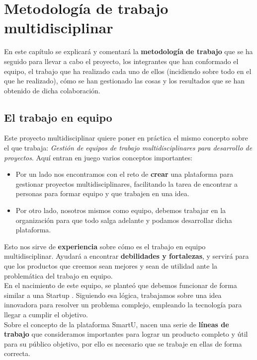 \chapter{Metodología de trabajo multidisciplinar}
En este capítulo se explicará y comentará la \textbf{metodología de trabajo} que se ha seguido para llevar a cabo el proyecto, los integrantes que han conformado el equipo, el trabajo que ha realizado cada uno de ellos (incidiendo sobre todo en el que he realizado), cómo se han gestionado las cosas y los resultados que se han obtenido de dicha colaboración.

\section{El trabajo en equipo}
Este proyecto multidisciplinar quiere poner en práctica el mismo concepto sobre el que trabaja: \textit{Gestión de equipos de trabajo multidisciplinares para desarrollo de proyectos}. Aquí entran en juego varios conceptos importantes:

\begin{itemize}
    \item Por un lado nos encontramos con el reto de \textbf{crear} una plataforma para gestionar proyectos multidisciplinares, facilitando la tarea de encontrar a personas para formar equipo y que trabajen en una idea.
    \item Por otro lado, nosotros mismos como equipo, debemos trabajar en la organización para que todo salga adelante y podamos desarrollar dicha plataforma.
\end{itemize}

Esto nos sirve de \textbf{experiencia} sobre cómo es el trabajo en equipo multidisciplinar. Ayudará a encontrar \textbf{debilidades y fortalezas}, y servirá para que los productos que creemos sean mejores y sean de utilidad ante la problemática del trabajo en equipo.\\

En el nacimiento de este equipo, se planteó que debemos funcionar de forma similar a una Startup \cite{startup}. Siguiendo esa lógica, trabajamos sobre una idea innovadora para resolver un problema complejo, empleando la tecnología para llegar a cumplir el objetivo.\\

Sobre el concepto de la plataforma SmartU, nacen una serie de \textbf{líneas de trabajo} que consideramos importantes para lograr un producto completo y útil para su público objetivo, por ello es necesario que se trabaje en ellas de forma correcta.

